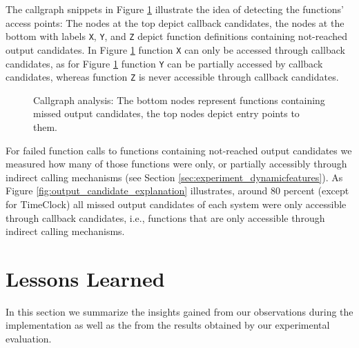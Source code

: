 \documentclass[sigconf]{acmart}
\renewcommand{\sf}[1]{\textsf{#1}}
\renewcommand{\tt}[1]{\texttt{#1}}
\begin{document}
The callgraph snippets in Figure \ref{fig:callgraph} illustrate the idea of
detecting the functions’ access points: The nodes at the top depict callback
candidates, the nodes at the bottom with labels \tt{X}, \tt{Y}, and \tt{Z}
depict function definitions containing not-reached output candidates. In Figure
\ref{fig:callgraph} function \tt{X} can only be accessed through callback
candidates, as for Figure \ref{fig:callgraph} function \tt{Y} can be partially
accessed by callback candidates, whereas function \tt{Z} is never accessible
through callback candidates.

\begin{figure}
    
    \caption{Callgraph analysis: The bottom nodes represent functions
    containing missed output candidates, the top nodes depict entry points to
    them.}
    \label{fig:callgraph} 
\end{figure}


For failed function calls to functions containing not-reached output
candidates we measured how many of those functions were only, or
partially accessibly through indirect calling mechanisms (see Section
\ref{sec:experiment_dynamicfeatures}). As Figure
\ref{fig:output_candidate_explanation} illustrates, around 80 percent (except
for \sf{TimeClock}) all missed output candidates of each system were only
accessible through callback candidates, i.e., functions that are only
accessible through indirect calling mechanisms.

\section{Lessons Learned}
In this section we summarize the insights gained from our observations during
the implementation as well as the from the results obtained by our experimental
evaluation.
\end{document}
